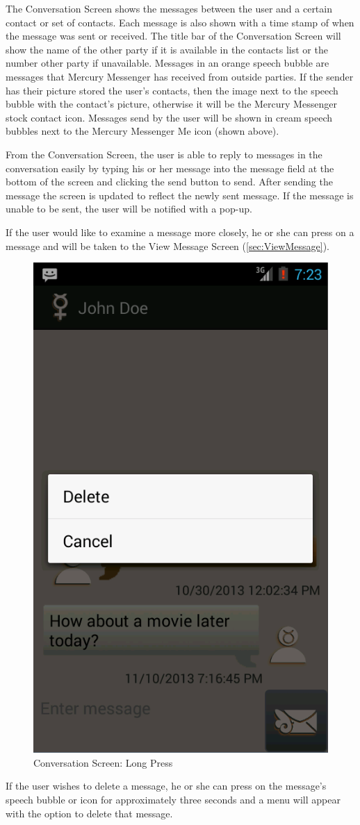 \documentclass{article}
\begin{document}
\par The Conversation Screen shows the messages between the user and a certain contact or set of contacts. Each message is also shown with a time stamp of when the message was sent or received.
The title bar of the Conversation Screen will show the name of the other party if it is available in the contacts list or the number other party if unavailable.
Messages in an orange speech bubble are messages that Mercury Messenger has received from outside parties. 
If the sender has their picture stored the user's contacts, then the image next to the speech bubble with the contact's picture, otherwise it will be the Mercury Messenger stock contact icon.
Messages send by the user will be shown in cream speech bubbles next to the Mercury Messenger Me icon (shown above).

\par From the Conversation Screen, the user is able to reply to messages in the conversation easily by typing his or her message into the message field at the bottom of the screen and clicking the send button to send.
After sending the message the screen is updated to reflect the newly sent message.
If the message is unable to be sent, the user will be notified with a pop-up.

\par If the user would like to examine a message more closely, he or she can press on a message and will be taken to the View Message Screen (\autoref{sec:ViewMessage}).

\begin{figure}[h!]
\centering
\includegraphics[width=.25\textwidth]{"./Screen_shots/Conversation_Long_Press"}{}
\caption{Conversation Screen: Long Press}
\label{fig:ConversationLongPress}
\end{figure}

\par If the user wishes to delete a message, he or she can press on the message's speech bubble or icon for approximately three seconds and a menu will appear with the option to delete that message.
\end{document}
